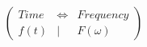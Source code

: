 \documentclass[preview]{standalone}
\begin{document}
\begin{align*}
\left( \begin{array}{cl} Time & \Longleftrightarrow & Frequency \\ f(t) & | & F(\omega) \end{array} \right)
\end{align*}
\end{document}
